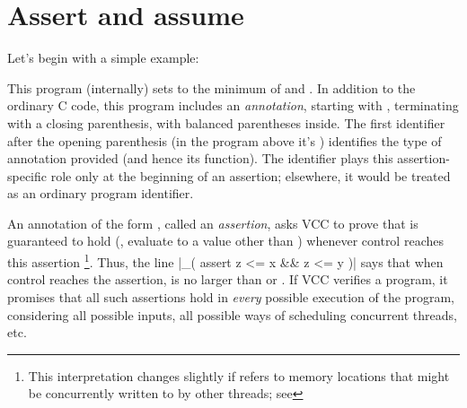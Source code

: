 \section{Assert and assume}
\label{sect:assert-assume}


Let's begin with a simple example:

This program (internally) sets  to the minimum of  and
. In addition to the ordinary C code, this program includes an
\emph{annotation}, starting with \vcc{_(}, terminating with a closing
parenthesis, with balanced parentheses inside. The first identifier
after the opening parenthesis (in the program above it's )
identifies the type of annotation provided (and hence its function).
The identifier plays this assertion-specific role only 
at the beginning of an assertion; elsewhere, it would be treated as
an ordinary program identifier.

An annotation of the form , called an \emph{assertion}, asks VCC to prove that
 is guaranteed to hold (\ie, evaluate to a value other than )
whenever control reaches this assertion%
\footnote{
  This interpretation changes slightly if  refers to
  memory locations that might be concurrently written to by other
  threads; see }.  
Thus, the line \vcc|_( assert z <= x && z <= y )| says
that when control reaches the assertion,  is no larger than  or
. If VCC verifies a program, it promises that all such assertions
hold in \emph{every} possible execution of the program, considering all possible inputs,
all possible ways of scheduling concurrent threads, etc. 

